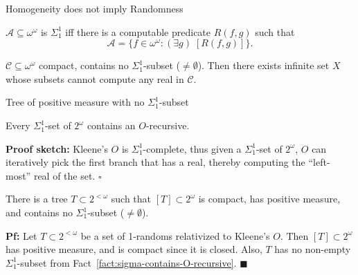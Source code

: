 \begin{frame}{Homogeneity does not imply Randomness}
  \begin{center}
  \end{center}

  \begin{define*}
    $\mathcal{A}\subseteq\omega^\omega$ is $\Sigma_1^1$ iff there is a
    computable predicate $R(f,g)$ such that
    \[\mathcal{A} =\{f\in\omega^\omega: (\exists g)\; [R(f,g)]\}.\]
  \end{define*}

  \begin{main-thm*}
    $\mathcal{C}\subseteq\omega^\omega$ compact, contains no
    $\Sigma_1^1$-subset ($\neq\emptyset$). Then there exists infinite set
    $X$ whose subsets cannot compute any real in $\mathcal{C}$.
  \end{main-thm*}
\end{frame}

\begin{frame}{Tree of positive measure with no $\Sigma_1^1$-subset}
  \begin{fact}
    \label{fact:sigma-contains-O-recursive}
    Every $\Sigma_1^1$-set of $2^\omega$ contains an $O$-recursive.
  \end{fact}
  \textbf{Proof sketch:} Kleene's $O$ is $\Sigma_1^1$-complete, thus given a 
  $\Sigma_1^1$-set of $2^\omega$, $O$ can iteratively pick the first branch
  that has a real, thereby computing the ``left-most'' real of the set.
  $\square$

  \vspace{1em}
  \begin{thm}
    There is a tree $T\subset2^{<\omega}$ such that $[T]\subset
    2^\omega$ is compact, has positive measure, and contains no
    $\Sigma_1^1$-subset ($\neq\emptyset$).
  \end{thm}
  \textbf{Pf:} Let $T\subset2^{<\omega}$ be a set of 1-randoms
  relativized to Kleene's $O$. Then $[T]\subset 2^\omega$ has positive
  measure, and is compact since it is closed. Also, $T$ has no non-empty
  $\Sigma_1^1$-subset from Fact~\ref{fact:sigma-contains-O-recursive}.
  $\blacksquare$
\end{frame}


